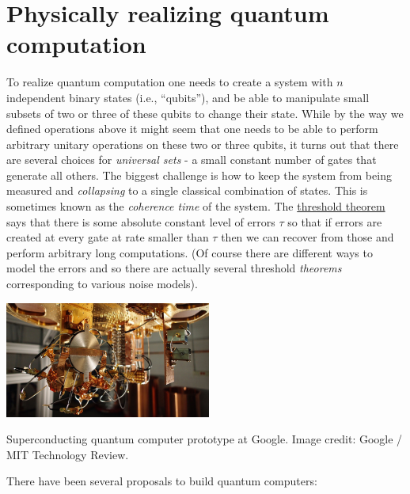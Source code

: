 \section{Physically realizing quantum
computation}\label{Physically-realizing-quan}

To realize quantum computation one needs to create a system with \(n\)
independent binary states (i.e., ``qubits''), and be able to manipulate
small subsets of two or three of these qubits to change their state.
While by the way we defined operations above it might seem that one
needs to be able to perform arbitrary unitary operations on these two or
three qubits, it turns out that there are several choices for
\emph{universal sets} - a small constant number of gates that generate
all others. The biggest challenge is how to keep the system from being
measured and \emph{collapsing} to a single classical combination of
states. This is sometimes known as the \emph{coherence time} of the
system. The
\href{https://courses.cs.washington.edu/courses/cse599d/06wi/lecturenotes19.pdf}{threshold
theorem} says that there is some absolute constant level of errors
\(\tau\) so that if errors are created at every gate at rate smaller
than \(\tau\) then we can recover from those and perform arbitrary long
computations. (Of course there are different ways to model the errors
and so there are actually several threshold \emph{theorems}
corresponding to various noise models).


\begin{marginfigure}
\centering
\includegraphics[width=\linewidth, height=1.5in, keepaspectratio]{../figure/googlequantum.jpg}
\caption{Superconducting quantum computer prototype at Google. Image
credit: Google / MIT Technology Review.}
\label{googlequantumfig}
\end{marginfigure}

There have been several proposals to build quantum computers:

